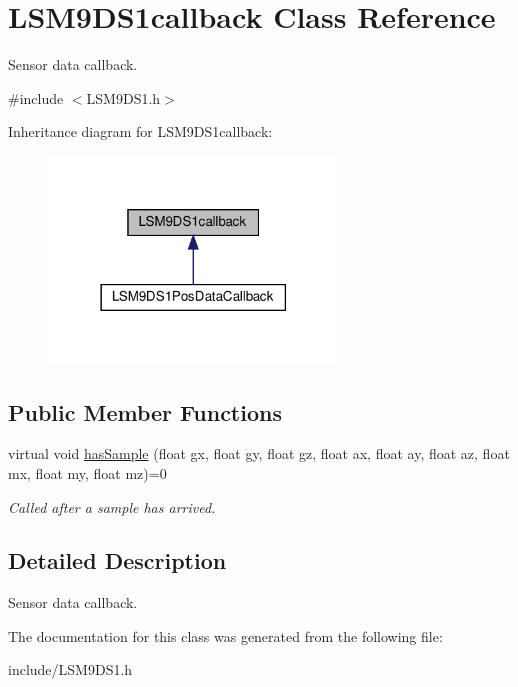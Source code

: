 \hypertarget{classLSM9DS1callback}{}\section{L\+S\+M9\+D\+S1callback Class Reference}
\label{classLSM9DS1callback}


Sensor data callback.  




{\ttfamily \#include $<$L\+S\+M9\+D\+S1.\+h$>$}



Inheritance diagram for L\+S\+M9\+D\+S1callback\+:
\nopagebreak
\begin{figure}[H]
\begin{center}
\leavevmode
\includegraphics[width=218pt]{classLSM9DS1callback__inherit__graph}
\end{center}
\end{figure}
\subsection*{Public Member Functions}
\begin{DoxyCompactItemize}
\item 
\mbox{\label{classLSM9DS1callback_a6efb40eeb27fbb5fd0ffbdf2dbbdf326}} 
virtual void \hyperlink{classLSM9DS1callback_a6efb40eeb27fbb5fd0ffbdf2dbbdf326}{has\+Sample} (float gx, float gy, float gz, float ax, float ay, float az, float mx, float my, float mz)=0
\begin{DoxyCompactList}\small\item\em Called after a sample has arrived. \end{DoxyCompactList}\end{DoxyCompactItemize}


\subsection{Detailed Description}
Sensor data callback. 

The documentation for this class was generated from the following file\+:\begin{DoxyCompactItemize}
\item 
include/L\+S\+M9\+D\+S1.\+h\end{DoxyCompactItemize}
